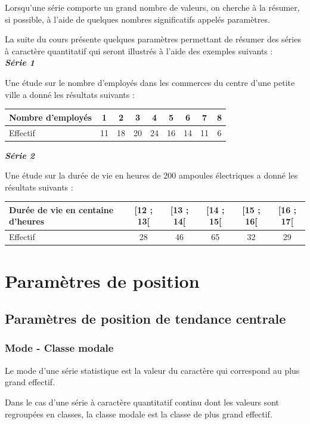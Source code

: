\documentclass[french]{book}
\begin{document}
Lorsqu'une s\'erie comporte un grand nombre de valeurs, on cherche à la r\'esumer, si possible, à l'aide de quelques nombres significatifs appel\'es param\`etres.

La suite du cours pr\'esente quelques param\`etres permettant de r\'esumer des s\'eries à caract\`ere quantitatif qui seront illustr\'es à l'aide des exemples suivants :\\

\textbf{\textit{S\'erie 1}}

Une \'etude sur le nombre d'employ\'es dans les commerces du centre d'une petite ville a donn\'e les r\'esultats suivants :

\begin{center}
\begin{tabular}{|l|c|c|c|c|c|c|c|c|}\hline
Nombre d'employ\'es & 1 & 2 & 3 & 4 & 5 & 6 & 7 & 8 \\ \hline
Effectif & 11 & 18 & 20 & 24 & 16 & 14 & 11 & 6 \\ \hline
\end{tabular}
\end{center}

\textbf{\textit{S\'erie 2}}

Une \'etude sur la dur\'ee de vie en heures de 200 ampoules \'electriques a donn\'e les r\'esultats suivants :

\begin{center}
\begin{tabular}{|m{3cm}|c|c|c|c|c|}\hline
Dur\'ee de vie en centaine d'heures & [12 ; 13[ & [13 ; 14[ & [14 ; 15[ & [15 ; 16[ & [16 ; 17[ \\ \hline
Effectif & 28 & 46 & 65 & 32 & 29 \\ \hline
\end{tabular}
\end{center}



\section{Param\`etres de position}
\subsection{Param\`etres de position de tendance centrale}
\subsubsection*{Mode - Classe modale}
\begin{defn}
Le mode d'une s\'erie statistique est la valeur du caract\`ere qui correspond au plus grand effectif.

Dans le cas d'une s\'erie à caract\`ere quantitatif continu dont les valeurs sont regroup\'ees en classes, la classe modale est la classe de plus grand effectif.
\end{defn}
\end{document}

